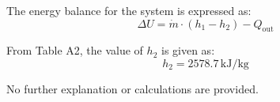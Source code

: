The energy balance for the system is expressed as:  
\[
\Delta U = \dot{m} \cdot (h_1 - h_2) - Q_{\text{out}}
\]  

From Table A2, the value of \( h_2 \) is given as:  
\[
h_2 = 2578.7 \, \text{kJ/kg}
\]  

No further explanation or calculations are provided.